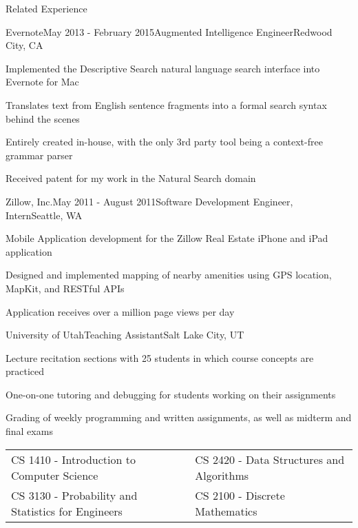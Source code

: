 \documentclass{resume}
\begin{document}
\begin{rSection}{Related Experience}

\begin{experienceEvernote}
\begin{rSubsection}{Evernote}{May 2013 - February 2015}{Augmented Intelligence Engineer}{Redwood City, CA}
\item Implemented the Descriptive Search natural language search interface into Evernote for Mac
\item Translates text from English sentence fragments into a formal search syntax behind the scenes
\item Entirely created in-house, with the only 3rd party tool being a context-free grammar parser
\item Received patent for my work in the Natural Search domain
\end{rSubsection}
\end{experienceEvernote}


\begin{experienceZillow}
\begin{rSubsection}{Zillow, Inc.}{May 2011 - August 2011}{Software Development Engineer, Intern}{Seattle, WA}
\item Mobile Application development for the Zillow Real Estate iPhone and iPad application
\item Designed and implemented mapping of nearby amenities using GPS location, MapKit, and RESTful APIs
\item Application receives over a million page views per day
\end{rSubsection}
\end{experienceZillow}


\begin{experienceTA}
\begin{rSubsection}{University of Utah}{}{Teaching Assistant}{Salt Lake City, UT}
\item Lecture recitation sections with 25 students in which course concepts are practiced
\item One-on-one tutoring and debugging for students working on their assignments
\item Grading of weekly programming and written assignments, as well as midterm and final exams
\\
\begin{tabularx}{\textwidth}{ l l }
CS 1410 - Introduction to Computer Science & CS 2420 - Data Structures and Algorithms \\
CS 3130 - Probability and Statistics for Engineers & CS 2100 - Discrete Mathematics \\
\end{tabularx}
\end{rSubsection}
\end{experienceTA}


\end{rSection}
\end{document}
